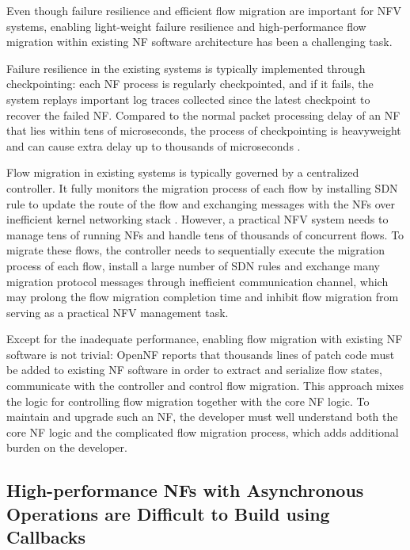 Even though failure resilience and efficient flow migration are important for NFV systems, enabling light-weight failure resilience and high-performance flow migration within existing NF software architecture has been a challenging task.

Failure resilience in the existing systems \cite{sherry2015rollback,rajagopalan2013pico} is typically implemented through checkpointing: each NF process is regularly checkpointed, and if it fails, the system replays important log traces collected since the latest checkpoint to recover the failed NF. Compared to the normal packet processing delay of an NF that lies within tens of microseconds, the process of checkpointing is heavyweight and can cause extra delay up to thousands of microseconds \cite{sherry2015rollback, rajagopalan2013pico}.

Flow migration in existing systems \cite{rajagopalan2013split, gember2015opennf} is typically governed by a centralized controller. It fully monitors the migration process of each flow by installing SDN rule to update the route of the flow and exchanging messages with the NFs over inefficient kernel networking stack \cite{netmap}. However, a practical NFV system needs to manage tens of running NFs and handle tens of thousands of concurrent flows. To migrate these flows, the controller needs to sequentially execute the migration process of each flow, install a large number of SDN rules and exchange many migration protocol messages through inefficient communication channel, which may prolong the flow migration completion time and inhibit flow migration from serving as a practical NFV management task.

Except for the inadequate performance, enabling flow migration with existing NF software is not trivial: OpenNF \cite{gember2015opennf} reports that thousands lines of patch code must be added to existing NF software \cite{bro, squid} in order to extract and serialize flow states, communicate with the controller and control flow migration. This approach mixes the logic for controlling flow migration together with the core NF logic. To maintain and upgrade such an NF, the developer must well understand both the core NF logic and the complicated flow migration process, which adds additional burden on the developer.

\subsection{High-performance NFs with Asynchronous Operations are Difficult to Build using Callbacks}

